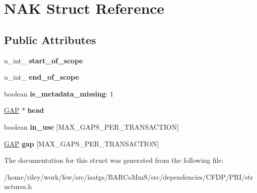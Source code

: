 \hypertarget{struct_n_a_k}{}\section{N\+AK Struct Reference}
\label{struct_n_a_k}
\subsection*{Public Attributes}
\begin{DoxyCompactItemize}
\item 
u\+\_\+int\+\_ {\bfseries start\+\_\+of\+\_\+scope}\hypertarget{struct_n_a_k_aee9506694f57879a52b982775a89a447}{}\label{struct_n_a_k_aee9506694f57879a52b982775a89a447}

\item 
u\+\_\+int\+\_ {\bfseries end\+\_\+of\+\_\+scope}\hypertarget{struct_n_a_k_a046120aa9a95115f4bb0b5a66a6dbdff}{}\label{struct_n_a_k_a046120aa9a95115f4bb0b5a66a6dbdff}

\item 
boolean {\bfseries is\+\_\+metadata\+\_\+missing}\+: 1\hypertarget{struct_n_a_k_a10a9c51ea5f393093f2814362cc9d939}{}\label{struct_n_a_k_a10a9c51ea5f393093f2814362cc9d939}

\item 
\hyperlink{structgap}{G\+AP} $\ast$ {\bfseries head}\hypertarget{struct_n_a_k_abc8812e8a65c2078604e01f676830569}{}\label{struct_n_a_k_abc8812e8a65c2078604e01f676830569}

\item 
boolean {\bfseries in\+\_\+use} \mbox{[}M\+A\+X\+\_\+\+G\+A\+P\+S\+\_\+\+P\+E\+R\+\_\+\+T\+R\+A\+N\+S\+A\+C\+T\+I\+ON\mbox{]}\hypertarget{struct_n_a_k_a2ae41f6899529ee96e3339d4cbce8c4a}{}\label{struct_n_a_k_a2ae41f6899529ee96e3339d4cbce8c4a}

\item 
\hyperlink{structgap}{G\+AP} {\bfseries gap} \mbox{[}M\+A\+X\+\_\+\+G\+A\+P\+S\+\_\+\+P\+E\+R\+\_\+\+T\+R\+A\+N\+S\+A\+C\+T\+I\+ON\mbox{]}\hypertarget{struct_n_a_k_af1e1ca6e491d5e9b343e8e30d2c9e112}{}\label{struct_n_a_k_af1e1ca6e491d5e9b343e8e30d2c9e112}

\end{DoxyCompactItemize}


The documentation for this struct was generated from the following file\+:\begin{DoxyCompactItemize}
\item 
/home/riley/work/fsw/src/isatgs/\+B\+A\+R\+Co\+Mm\+S/src/dependencies/\+C\+F\+D\+P/\+P\+R\+I/structures.\+h\end{DoxyCompactItemize}
